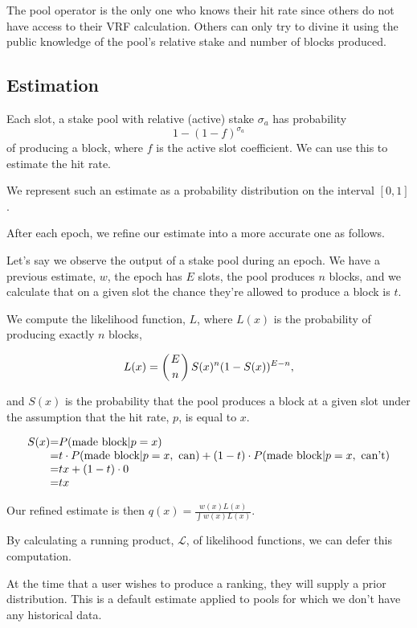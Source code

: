 \documentclass[11pt,a4paper,dvipsnames,twosided]{article}
\begin{document}
The pool operator is the only one who knows their
hit rate since others do not have access to their VRF calculation.
Others can only try to divine it using the public knowledge of the
pool's relative stake and number of blocks produced.

\subsection{Estimation}

Each slot, a stake pool with relative (active) stake $\sigma_a$ has probability
\[ 1 - (1-f)^{\sigma_a} \]
of producing a block, where $f$ is the active slot coefficient.
We can use this to estimate the hit rate.

We represent such an estimate as a probability distribution on the interval $[0,1]$.

After each epoch, we refine our estimate into a more accurate one as follows.

Let's say we
observe the output of a stake pool during an epoch. We have a previous estimate, $w$, the
epoch has $E$ slots, the pool produces $n$ blocks, and we calculate that on a given slot
the chance they're allowed to produce a block is $t$.

We compute the likelihood function, $L$, where $L(x)$ is the probability of producing exactly $n$ blocks,

\[ L(x) = \left( E \atop n \right) S(x)^{n} (1-S(x))^{E - n}, \]

and $S(x)$ is the probability that the pool produces a block at a given slot under the assumption that the
hit rate, $p$, is equal to $x$.

\[
\begin{array}{r@{=}l}
S(x) & P( \text{made block} | p = x) \\
     & t \cdot P( \text{made block} | p = x,~\text{can}) + (1-t) \cdot P( \text{made block} | p = x,~\text{can't}) \\
     & tx                              + (1-t) \cdot 0 \\
     & tx \\
\end{array}
\]

Our refined estimate is then $q(x) = \frac{w(x)L(x)}{\int w(x)L(x)}$.

By calculating a running product, $\mathcal{L}$, of likelihood functions, we can defer this computation.

At the time that a user wishes to produce a ranking, they will
supply a prior distribution. This is a default estimate applied to pools for which we don't have any historical data.
\end{document}
